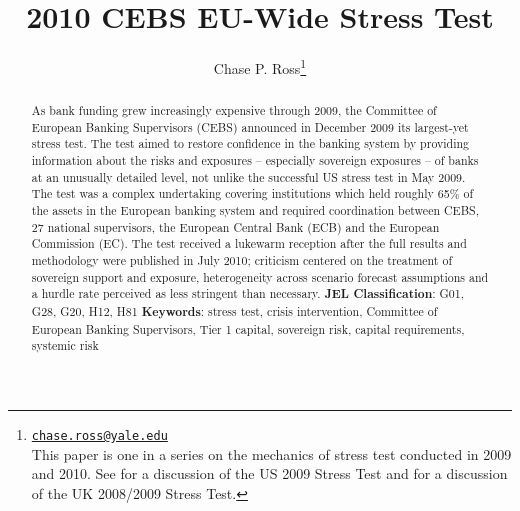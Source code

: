 \documentclass[12pt]{article}
\begin{document}
\lhead{ }

\renewcommand{\headrulewidth}{0.0pt}
\renewcommand{\footrulewidth}{0.0pt}


\title{2010 CEBS EU-Wide Stress Test}%
\author{Chase P. Ross\thanks{\texttt{\href{mailto:chase.ross@yale.edu}{chase.ross@yale.edu}} \\ This paper is one in a series on the mechanics of stress test conducted in 2009 and 2010. See \citet{Ross2016a} for a discussion of the US 2009 Stress Test and \citet{Ross2016b} for a discussion of the UK 2008/2009 Stress Test.}}



\maketitle

\begin{abstract}
As bank funding grew increasingly expensive through 2009, the Committee of European Banking Supervisors (CEBS) announced in December 2009 its largest-yet stress test. The test aimed to restore confidence in the banking system by providing information about the risks and exposures -- especially sovereign exposures -- of banks at an unusually detailed level, not unlike the successful US stress test in May 2009. The test was a complex undertaking covering institutions which held roughly 65\% of the assets in the European banking system and required coordination between CEBS, 27 national supervisors, the European Central Bank (ECB) and the European Commission (EC). The test received a lukewarm reception after the full results and methodology were published in July 2010; criticism centered on the treatment of sovereign support and exposure, heterogeneity across scenario forecast assumptions and a hurdle rate perceived as less stringent than necessary.
\newline
\newline
\textbf{JEL Classification}: G01, G28, G20, H12, H81
\newline
\newline
\textbf{Keywords}: stress test, crisis intervention, Committee of European Banking Supervisors, Tier 1 capital, sovereign risk, capital requirements, systemic risk

\end{abstract}
\newpage
\tableofcontents
\newpage
\end{document}
